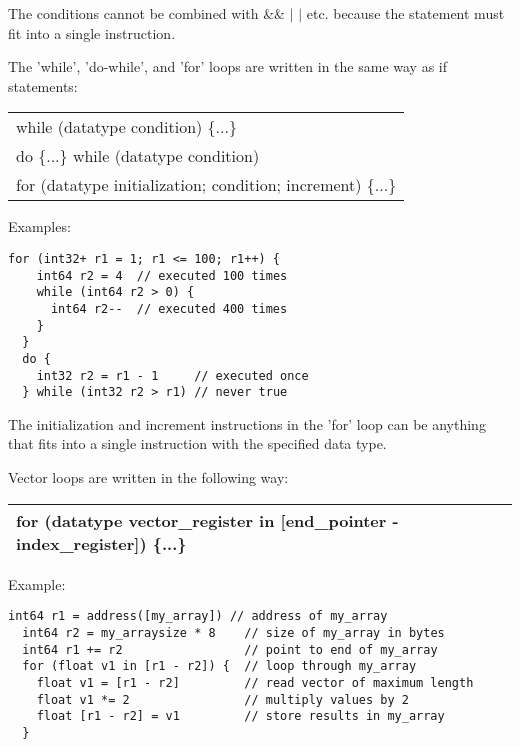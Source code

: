 \documentclass[forwardcom.tex]{subfiles}
\begin{document}
The conditions cannot be combined with \&\& $\vert$ $\vert$ etc. because the statement must fit into a single instruction.
\vspace{2mm}

The 'while', 'do-while', and 'for' loops are written in the same way as if statements:

\begin{tabular}{|p{150mm}|}
\hline
\hspace{4mm} while (datatype condition) \{...\}\\
\hspace{4mm} do \{...\} while (datatype condition) \\
\hspace{4mm} for (datatype initialization; condition; increment) \{...\}\\
\hline
\end{tabular}
\vspace{2mm}

Examples:
\vspace{2mm}

\begin{lstlisting}[frame=single]
  for (int32+ r1 = 1; r1 <= 100; r1++) {
    int64 r2 = 4  // executed 100 times
    while (int64 r2 > 0) {
      int64 r2--  // executed 400 times
    }
  } 
  do {
    int32 r2 = r1 - 1     // executed once
  } while (int32 r2 > r1) // never true
\end{lstlisting}
\vspace{2mm}

The initialization and increment instructions in the 'for' loop can be anything that fits into a single instruction with the specified data type.
\vspace{2mm}

Vector loops are written in the following way:

\begin{tabular}{|p{150mm}|}
\hline
\hspace{4mm} for (datatype vector\_register in [end\_pointer - index\_register]) \{...\}\\
\hline
\end{tabular}
\vspace{4mm}

Example:
\vspace{2mm}

\begin{lstlisting}[frame=single]
  int64 r1 = address([my_array]) // address of my_array
  int64 r2 = my_arraysize * 8    // size of my_array in bytes
  int64 r1 += r2                 // point to end of my_array
  for (float v1 in [r1 - r2]) {  // loop through my_array
    float v1 = [r1 - r2]         // read vector of maximum length
    float v1 *= 2                // multiply values by 2
    float [r1 - r2] = v1         // store results in my_array
  }
\end{lstlisting}
\vspace{2mm}
\end{document}
